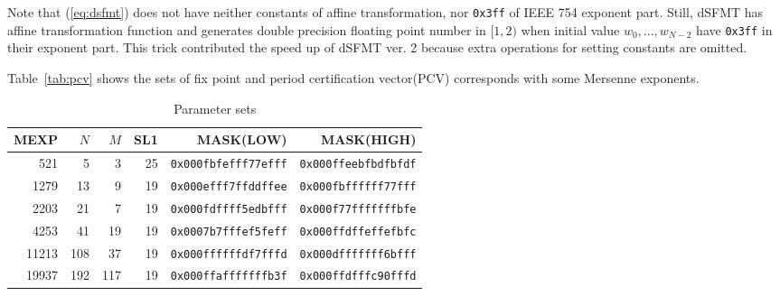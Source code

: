 \documentclass{svmult}
\begin{document}
Note that (\ref{eq:dsfmt}) does not have neither constants of affine
transformation, nor \texttt{0x3ff} of IEEE 754 exponent part.  Still,
dSFMT has affine transformation function and generates double
precision floating point number in $[1, 2)$ when initial value $w_0,
..., w_{N-2}$ have \texttt{0x3ff} in their exponent part. This trick
contributed the speed up of dSFMT ver. 2 because extra operations for
setting constants are omitted.

Table~\ref{tab:pcv} shows the sets of fix point and period
certification vector(PCV) corresponds with some Mersenne exponents.


\begin{table}
  \begin{center}
    \caption{Parameter sets}
    \label{tab:params}
    \begin{tabular}{rrrrrr} \hline
      MEXP & $N$ & $M$ & SL1 & MASK(LOW) & MASK(HIGH) \\ \hline \hline
      521 & 5 & 3 & 25 & \texttt{0x000fbfefff77efff} 
      & \texttt{0x000ffeebfbdfbfdf} \\
      1279 & 13 & 9 & 19 & \texttt{0x000efff7ffddffee} 
      & \texttt{0x000fbffffff77fff} \\
      2203 & 21 & 7 & 19 & \texttt{0x000fdffff5edbfff} 
      & \texttt{0x000f77fffffffbfe} \\
      4253 & 41 & 19 & 19 & \texttt{0x0007b7fffef5feff} 
      & \texttt{0x000ffdffeffefbfc} \\
      11213 & 108 & 37 & 19 & \texttt{0x000ffffffdf7fffd} 
      & \texttt{0x000dfffffff6bfff} \\
      19937 & 192 & 117 & 19 & \texttt{0x000ffafffffffb3f} 
      & \texttt{0x000ffdfffc90fffd} \\ \hline
    \end{tabular}
  \end{center}
\end{table}

\end{document}
